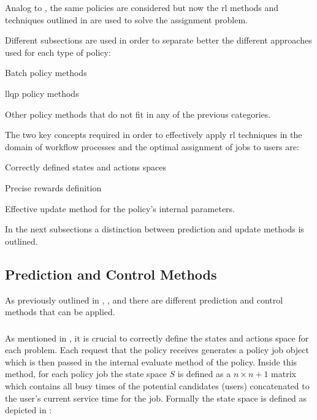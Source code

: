 \documentclass{seal_thesis}
\begin{document}
Analog to , the same policies are considered but now the \gls{rl} methods and techniques outlined in  are used to solve the assignment problem.

Different subsections are used in order to separate better the different approaches used for each type of policy:
\begin{enumerate*}
	\item Batch policy methods
	\item \gls{llqp} policy methods
	\item Other policy methods that do not fit in any of the previous categories.
\end{enumerate*}

The two key concepts required in order to effectively apply \gls{rl} techniques in the domain of workflow processes and the optimal assignment of jobs to users are:
\begin{enumerate*}
	\item Correctly defined states and actions spaces
	\item Precise rewards definition
	\item Effective update method for the policy's internal parameters. 
\end{enumerate*}

In the next subsections a distinction between prediction and update methods is outlined.

\subsection{Prediction and Control Methods}

As previously outlined in , ,  and  there are different prediction and control methods that can be applied.

\subsubsection{}

As mentioned in , it is crucial to correctly define the states and actions space for each problem. Each request that the policy receives generates a policy job object which is then passed in the internal evaluate method of the policy. Inside this method, for each policy job the state space $S$ is defined as a $n \times n+1$ matrix which contains all busy times of the potential candidates (\ie users) concatenated to the user's current service time for the job. Formally the state space is defined as depicted in :
\end{document}
